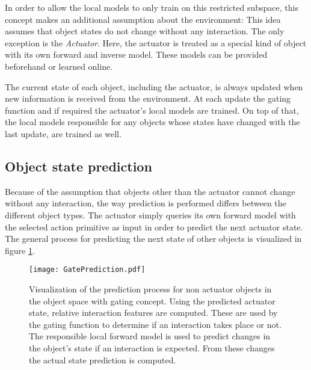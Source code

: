 In order to allow the local models to only train on this restricted subspace, this concept makes an additional assumption about the environment: 
This idea assumes that object states do not change without any interaction. The only exception is the \textit{Actuator}. Here, the actuator is treated as a special kind of object with its own forward and inverse model. These models can be provided beforehand or learned online.  

The current state of each object, including the actuator, is always updated when new information is received from the environment. At each update the gating function and if required the actuator's local models are trained. On top of that, the local models responsible for any objects whose states have changed with the last update, are trained as well.




\subsection{Object state prediction \label{sec:gatePrediction}}

Because of the assumption that objects other than the actuator cannot change without any interaction, the way prediction is performed differs between the different object types. The actuator simply queries its own forward model with the selected action primitive as input in order to predict the next actuator state. 
The general process for predicting the next state of other objects is visualized in figure \ref{fig:GatePrediction}.

\begin{figure}[h]
	\centering
	\texttt{[image: GatePrediction.pdf]}
	\caption{Visualization of the prediction process for non actuator objects in the object space with gating concept. Using the predicted actuator state, relative interaction features are computed. These are used by the gating function to determine if an interaction takes place or not. The responsible local forward model is used to predict 
	changes in the object's state if an interaction is expected. From these changes the actual state prediction is computed.} 
	\label{fig:GatePrediction}
\end{figure}

